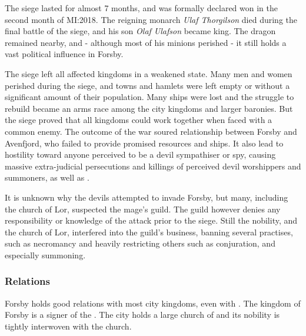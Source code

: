 The siege lasted for almost 7 months, and was formally declared won in the
second month of MI:2018. The reigning monarch \emph{Ulaf Thorgilson} died
during the final battle of the siege, and his son \emph{Olaf Ulafson} became
king. The dragon remained nearby, and - although most of his minions perished
- it still holds a vast political influence in Forsby.

The siege left all affected kingdoms in a weakened state. Many men and women
perished during the siege, and towns and hamlets were left empty or without
a significant amount of their population. Many ships were lost and the
struggle to rebuild became an arms race among the city kingdoms and larger
baronies. But the siege proved that all kingdoms could work together when
faced with a common enemy. The outcome of the war soured relationship between
Forsby and Avenfjord, who failed to provide promised resources and ships. It
also lead to hostility toward anyone perceived to be a devil sympathiser or
spy, causing massive extra-judicial persecutions and killings of perceived
devil worshippers and summoners, as well as .

It is unknown why the devils attempted to invade Forsby, but many, including
the church of Lor, suspected the mage's guild. The guild however denies any
responsibility or knowledge of the attack prior to the siege. Still the
nobility, and the church of Lor, interfered into the guild's business, banning
several practises, such as necromancy and heavily restricting others such as
conjuration, and especially summoning.

\subsubsection{Relations}

Forsby holds good relations with most city kingdoms, even with
. The kingdom of Forsby is a signer of the
. The city holds a large church of 
and its nobility is tightly interwoven with the church.
